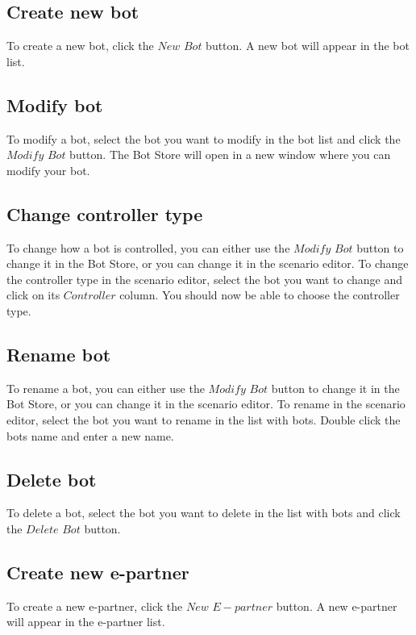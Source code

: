 \documentclass[a4paper]{article}
\begin{document}
\subsection{Create new bot}
To create a new bot, click the $New$ $Bot$ button. A new bot will appear in the bot list.%

\subsection{Modify bot}
To modify a bot, select the bot you want to modify in the bot list and click the $Modify$ $Bot$ button. The Bot Store will open in a new window where you can modify your bot.

\subsection{Change controller type}
To change how a bot is controlled, you can either use the $Modify$ $Bot$ button to change it in the Bot Store, or you can change it in the scenario editor. To change the controller type in the scenario editor, select the bot you want to change and click on its $Controller$ column. You should now be able to choose the controller type.

\subsection{Rename bot}
To rename a bot, you can either use the $Modify$ $Bot$ button to change it in the Bot Store, or you can change it in the scenario editor. To rename in the scenario editor, select the bot you want to rename in the list with bots. Double click the bots name and enter a new name. %

\subsection{Delete bot}
To delete a bot, select the bot you want to delete in the list with bots and click the $Delete$ $Bot$ button.

\subsection{Create new e-partner}
To create a new e-partner, click the $New$ $E-partner$ button. A new e-partner will appear in the e-partner list.%
\end{document}
